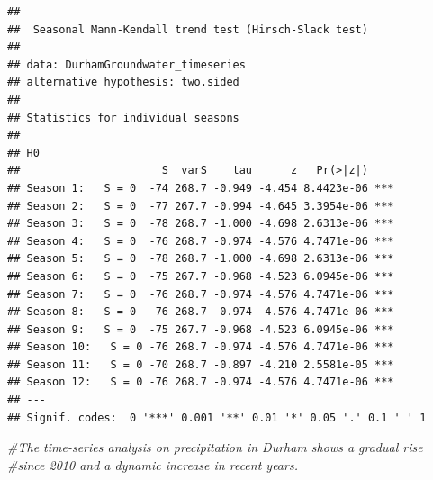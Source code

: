\documentclass[
  12pt,
]{article}
\newenvironment{Shaded}{\begin{snugshade}}{\end{snugshade}}
\newcommand{\CommentTok}[1]{\textcolor[rgb]{0.56,0.35,0.01}{\textit{#1}}}
\begin{document}
\begin{verbatim}
## 
##  Seasonal Mann-Kendall trend test (Hirsch-Slack test)
## 
## data: DurhamGroundwater_timeseries
## alternative hypothesis: two.sided
## 
## Statistics for individual seasons
## 
## H0
##                      S  varS    tau      z   Pr(>|z|)    
## Season 1:   S = 0  -74 268.7 -0.949 -4.454 8.4423e-06 ***
## Season 2:   S = 0  -77 267.7 -0.994 -4.645 3.3954e-06 ***
## Season 3:   S = 0  -78 268.7 -1.000 -4.698 2.6313e-06 ***
## Season 4:   S = 0  -76 268.7 -0.974 -4.576 4.7471e-06 ***
## Season 5:   S = 0  -78 268.7 -1.000 -4.698 2.6313e-06 ***
## Season 6:   S = 0  -75 267.7 -0.968 -4.523 6.0945e-06 ***
## Season 7:   S = 0  -76 268.7 -0.974 -4.576 4.7471e-06 ***
## Season 8:   S = 0  -76 268.7 -0.974 -4.576 4.7471e-06 ***
## Season 9:   S = 0  -75 267.7 -0.968 -4.523 6.0945e-06 ***
## Season 10:   S = 0 -76 268.7 -0.974 -4.576 4.7471e-06 ***
## Season 11:   S = 0 -70 268.7 -0.897 -4.210 2.5581e-05 ***
## Season 12:   S = 0 -76 268.7 -0.974 -4.576 4.7471e-06 ***
## ---
## Signif. codes:  0 '***' 0.001 '**' 0.01 '*' 0.05 '.' 0.1 ' ' 1
\end{verbatim}

\begin{Shaded}
\begin{Highlighting}[]
\CommentTok{\#The time{-}series analysis on precipitation in Durham shows a gradual rise }
\CommentTok{\#since 2010 and a dynamic increase in recent years. }
\end{Highlighting}
\end{Shaded}
\end{document}
